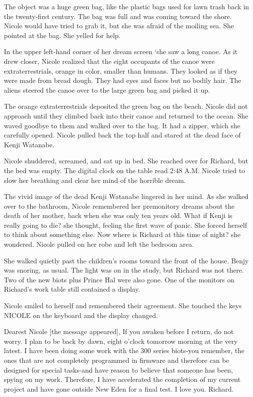 \documentclass[]{article}
\begin{document}
{The object was a huge green bag, like the plastic bags used for lawn trash back in the twenty-first century.  The bag was full and was coming toward the shore.  Nicole would have tried to grab it, but she was afraid of the moiling sea.  She pointed at the bag.  She yelled for help.

In the upper left-hand corner of her dream screen ‘she saw a long canoe.  As it drew closer, Nicole realized that the eight occupants of the canoe were extraterrestrials, orange in color, smaller than humans.  They looked as if they were made from bread dough.  They had eyes and faces but no bodily hair.  The aliens steered the canoe over to the large green bag and picked it up.

The orange extraterrestrials deposited the green bag on the beach.  Nicole did not approach until they climbed back into their canoe and returned to the ocean.  She waved goodbye to them and walked over to the bag.  It had a zipper, which she carefully opened.  Nicole pulled back the top half and stared at the dead face of Kenji Watanabe.

Nicole shuddered, screamed, and sat up in bed.  She reached over for Richard, but the bed was empty.  The digital clock on the table read 2:48 A.M.  Nicole tried to slow her breathing and clear her mind of the horrible dream.

The vivid image of the dead Kenji Watanabe lingered in her mind.  As she walked over to the bathroom, Nicole remembered her premonitory dreams about the death of her mother, back when she was only ten years old.  What if Kenji is really going to die? she thought, feeling the first wave of panic.  She forced herself to think about something else.  Now where is Richard at this time of night? she wondered.  Nicole pulled on her robe and left the bedroom area.

She walked quietly past the children’s rooms toward the front of the house.  Benjy was snoring, as usual.  The light was on in the study, but Richard was not there.  Two of the new biots plus Prince Hal were also gone.  One of the monitors on Richard’s work table still contained a display.

Nicole smiled to herself and remembered their agreement.  She touched the keys NICOLE on the keyboard and the display changed.

Dearest Nicole [the message appeared], If you awaken before I return, do not worry.  I plan to be back by dawn, eight o’clock tomorrow morning at the very latest.  I have been doing some work with the 300 series biots-you remember, the ones that are not completely programmed in firmware and therefore can be designed for special tasks-and have reason to believe that someone has been, spying on my work.  Therefore, I have accelerated the completion of my current project and have gone outside New Eden for a final test.  I love you.  Richard.

}
\end{document}
